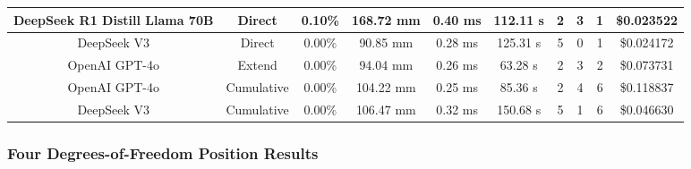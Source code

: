\begin{landscape}
\begin{table}[H]
\begin{center}
\begin{tabular}{|c|c|c|c|c|c|c|c|c|c|}
    \hline
    DeepSeek R1 Distill Llama 70B & Direct & 0.10\% & 168.72 mm & 0.40 ms & 112.11 s & 2 & 3 & 1 & \$0.023522 \\
    \hline
    DeepSeek V3 & Direct & 0.00\% & 90.85 mm & 0.28 ms & 125.31 s & 5 & 0 & 1 & \$0.024172 \\
    \hline
    OpenAI GPT-4o & Extend & 0.00\% & 94.04 mm & 0.26 ms & 63.28 s & 2 & 3 & 2 & \$0.073731 \\
    \hline
    OpenAI GPT-4o & Cumulative & 0.00\% & 104.22 mm & 0.25 ms & 85.36 s & 2 & 4 & 6 & \$0.118837 \\
    \hline
    DeepSeek V3 & Cumulative & 0.00\% & 106.47 mm & 0.32 ms & 150.68 s & 5 & 1 & 6 & \$0.046630 \\
    \hline
\end{tabular}
\label{Results-Position-4-6}
\end{center}
\end{table}

\subsubsection{Four Degrees-of-Freedom Position Results}


\end{landscape}
